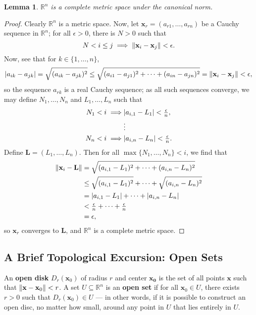 \documentclass[11pt]{article}
\newtheorem*{lemma*}{Lemma}
\renewcommand{\vec}[1]{\mathbf{#1}}
\begin{document}
\begin{adjustwidth}{1cm}{}
	\begin{lemma*}
		$\mathbb{R}^{n}$ is a complete metric space under the canonical norm.
	\end{lemma*}
    \begin{proof}\renewcommand{\qedsymbol}{}
		Clearly $\mathbb{R}^{n}$ is a metric space. Now, let $\vec{x}_{r} = (a_{r1}, \ldots, a_{rn})$ be a Cauchy sequence in $\mathbb{R}^{n}$; for all $\epsilon > 0$, there is $N > 0$ such that
		\[ N < i \le j \implies \norm{\vec{x}_{i} - \vec{x}_{j}} < \epsilon.  \]
		Now, see that for $k \in \{ 1, \ldots, n \}$,
		\[
			\abs{a_{ik} - a_{jk}} = \sqrt{(a_{ik} - a_{jk})^{2}} \le \sqrt{(a_{i1} - a_{j1})^{2} + \cdots + (a_{in} - a_{jn})^{2}} = \norm{\vec{x}_{i} - \vec{x}_{j}} < \epsilon,
		\]
		so the sequence $a_{rk}$ is a real Cauchy sequence; as all such sequences converge, we may define $N_{1}, \ldots, N_{n}$ and $L_{1}, \ldots, L_{n}$ such that
		\begin{align*}
			N_{1} < i \implies & \abs{a_{i, 1} - L_{1}} < \tfrac{\epsilon}{n}, \\
			& \vdots \\
			N_{n} < i \implies & \abs{a_{i, n} - L_{n}} < \tfrac{\epsilon}{n}.
		\end{align*}
		Define $\vec{L} = (L_{1}, \ldots, L_{n})$. Then for all $\max \{ N_{1}, \ldots, N_{n} \} < i$, we find that
		\begin{align*}
			\norm{\vec{x}_{i} - \vec{L}} &= \sqrt{(a_{i, 1} - L_{1})^{2} + \cdots + (a_{i, n} - L_{n})^{2}} \\ 
			&\le \sqrt{(a_{i, 1} - L_{1})^{2}} + \cdots + \sqrt{(a_{i, n} - L_{n})^{2}} \\
			&= \abs{a_{i, 1} - L_{1}} + \cdots + \abs{a_{i, n} - L_{n}} \\
			&< \tfrac{\epsilon}{n} + \cdots + \tfrac{\epsilon}{n} \\
			&= \epsilon,
		\end{align*}
		so $\vec{x}_{r}$ converges to $\vec{L}$, and $\mathbb{R}^{n}$ is a complete metric space.
	\end{proof}
\end{adjustwidth}

\subsection{A Brief Topological Excursion: Open Sets}

An \textbf{open disk} $D_{r} (\vec{x}_{0})$ of radius $r$ and center $\vec{x_{0}}$ is the set of all points $\vec{x}$ such that $\norm{\vec{x} - \vec{x}_{0}} < r$. A set $U \subseteq \mathbb{R}^{n}$ is an \textbf{open set} if for all $\vec{x}_{0} \in U$, there exists $r > 0$ such that $D_{r}(\vec{x}_{0}) \in U$ --- in other words, if it is possible to construct an open disc, no matter how small, around any point in $U$ that lies entirely in $U$.
\end{document}
